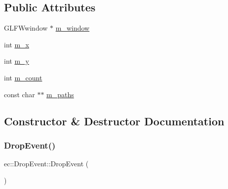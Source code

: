 \subsection*{Public Attributes}
\begin{DoxyCompactItemize}
\item 
G\+L\+F\+Wwindow $\ast$ \mbox{\hyperlink{structec_1_1_drop_event_a526c7694184ab65111ca5f8f4f2384fa}{m\+\_\+window}}
\item 
int \mbox{\hyperlink{structec_1_1_drop_event_ae1b8807808b78aecbdb27d51a4ab87eb}{m\+\_\+x}}
\item 
int \mbox{\hyperlink{structec_1_1_drop_event_a59338dd4b8cd47b7f025908a63be2e92}{m\+\_\+y}}
\item 
int \mbox{\hyperlink{structec_1_1_drop_event_a63c1174cdefa0a30b15667c9fa070a41}{m\+\_\+count}}
\item 
const char $\ast$$\ast$ \mbox{\hyperlink{structec_1_1_drop_event_ad7bdb28144cd5ccb2c13c4dbacff40cb}{m\+\_\+paths}}
\end{DoxyCompactItemize}


\subsection{Constructor \& Destructor Documentation}
\mbox{\label{structec_1_1_drop_event_a6ae6f5be022c3809bc204c365dc11cbc}} 
\subsubsection{\texorpdfstring{Drop\+Event()}{DropEvent()}\hspace{0.1cm}{\footnotesize\ttfamily [1/2]}}
{\footnotesize\ttfamily ec\+::\+Drop\+Event\+::\+Drop\+Event (\begin{DoxyParamCaption}{ }\end{DoxyParamCaption})\hspace{0.3cm}{\ttfamily [explicit]}}

\mbox{\label{structec_1_1_drop_event_a955d74612461f4100890101ddd1c2528}} 
